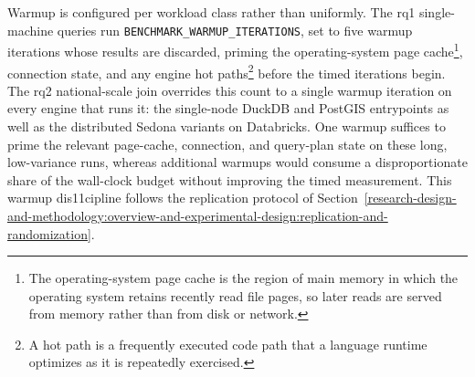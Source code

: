 Warmup is configured per workload class rather than uniformly. The \acrshort{rq}1 single-machine queries run \texttt{BENCHMARK\_WARMUP\_ITERATIONS}, set to five warmup iterations whose results are discarded, priming the operating-system page cache\footnote{The operating-system page cache is the region of main memory in which the operating system retains recently read file pages, so later reads are served from memory rather than from disk or network.}, connection state, and any engine hot paths\footnote{A hot path is a frequently executed code path that a language runtime optimizes as it is repeatedly exercised.} before the timed iterations begin. The \acrshort{rq}2 national-scale join overrides this count to a single warmup iteration on every engine that runs it: the single-node DuckDB and PostGIS entrypoints as well as the distributed Sedona variants on Databricks. One warmup suffices to prime the relevant page-cache, connection, and query-plan state on these long, low-variance runs, whereas additional warmups would consume a disproportionate share of the wall-clock budget without improving the timed measurement. This warmup dis11cipline follows the replication protocol of Section~\ref{research-design-and-methodology:overview-and-experimental-design:replication-and-randomization}.